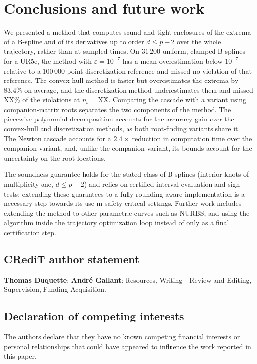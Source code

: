 \documentclass[final,5p,times,twocolumn]{elsarticle}
\theoremstyle{definition}
\begin{document}
\section{Conclusions and future work}
\label{sec:conclusion_and_future_work}
We presented a method that computes sound and tight enclosures of the extrema of a B-spline and of its derivatives up to order $d\le p-2$ over the whole trajectory, rather than at sampled times. On $31\,200$ uniform, clamped B-splines for a UR5e, the method with $\varepsilon=10^{-7}$ has a mean overestimation below $10^{-7}$ relative to a $100\,000$-point discretization reference and missed no violation of that reference. The convex-hull method is faster but overestimates the extrema by $83.4\%$ on average, and the discretization method underestimates them and missed XX\% of the violations at $n_s=\mathrm{XX}$. Comparing the cascade with a variant using companion-matrix roots separates the two components of the method. The piecewise polynomial decomposition accounts for the accuracy gain over the convex-hull and discretization methods, as both root-finding variants share it. The Newton cascade accounts for a $2.4\times$ reduction in computation time over the companion variant, and, unlike the companion variant, its bounds account for the uncertainty on the root locations.

The soundness guarantee holds for the stated class of B-splines (interior knots of multiplicity one, $d\le p-2$) and relies on certified interval evaluation and sign tests; extending these guarantees to a fully rounding-aware implementation is a necessary step towards its use in safety-critical settings. Further work includes extending the method to other parametric curves such as NURBS, and using the algorithm inside the trajectory optimization loop instead of only as a final certification step.

\subsection{CRediT author statement}
\textbf{Thomas Duquette}: 
\textbf{André Gallant}: Resources, Writing - Review and Editing, Supervision, Funding Acquisition.

\subsection{Declaration of competing interests}
The authors declare that they have no known competing financial interests or personal relationships that could have appeared to influence the work reported in this paper. 
\end{document}
